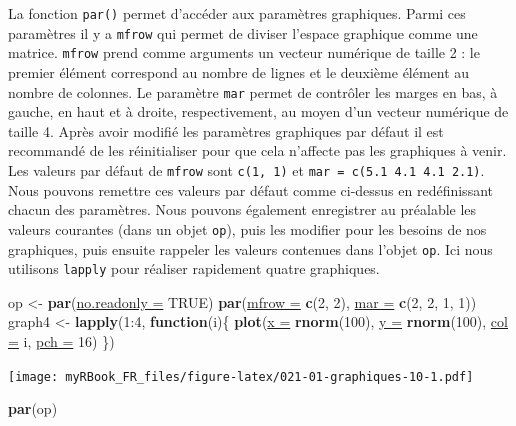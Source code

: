 \documentclass[twoside,symmetric]{book}
\newenvironment{Shaded}{}{}
\newcommand{\ControlFlowTok}[1]{\textbf{#1}}
\newcommand{\DataTypeTok}[1]{\underline{#1}}
\newcommand{\DecValTok}[1]{#1}
\newcommand{\KeywordTok}[1]{\textbf{#1}}
\newcommand{\NormalTok}[1]{#1}
\newcommand{\OperatorTok}[1]{#1}
\newcommand{\OtherTok}[1]{#1}
\newcommand{\StringTok}[1]{#1}
\begin{document}
La fonction \texttt{par()} permet d'accéder aux paramètres graphiques. Parmi ces paramètres il y a \texttt{mfrow} qui permet de diviser l'espace graphique comme une matrice. \texttt{mfrow} prend comme arguments un vecteur numérique de taille 2 : le premier élément correspond au nombre de lignes et le deuxième élément au nombre de colonnes. Le paramètre \texttt{mar} permet de contrôler les marges en bas, à gauche, en haut et à droite, respectivement, au moyen d'un vecteur numérique de taille 4. Après avoir modifié les paramètres graphiques par défaut il est recommandé de les réinitialiser pour que cela n'affecte pas les graphiques à venir. Les valeurs par défaut de \texttt{mfrow} sont \texttt{c(1,\ 1)} et \texttt{mar\ =\ c(5.1\ 4.1\ 4.1\ 2.1)}. Nous pouvons remettre ces valeurs par défaut comme ci-dessus en redéfinissant chacun des paramètres. Nous pouvons également enregistrer au préalable les valeurs courantes (dans un objet \texttt{op}), puis les modifier pour les besoins de nos graphiques, puis ensuite rappeler les valeurs contenues dans l'objet \texttt{op}. Ici nous utilisons \texttt{lapply} pour réaliser rapidement quatre graphiques.

\begin{Shaded}
\begin{Highlighting}[]
\NormalTok{op <-}\StringTok{ }\KeywordTok{par}\NormalTok{(}\DataTypeTok{no.readonly =} \OtherTok{TRUE}\NormalTok{)}
\KeywordTok{par}\NormalTok{(}\DataTypeTok{mfrow =} \KeywordTok{c}\NormalTok{(}\DecValTok{2}\NormalTok{, }\DecValTok{2}\NormalTok{), }\DataTypeTok{mar =} \KeywordTok{c}\NormalTok{(}\DecValTok{2}\NormalTok{, }\DecValTok{2}\NormalTok{, }\DecValTok{1}\NormalTok{, }\DecValTok{1}\NormalTok{))}
\NormalTok{graph4 <-}\StringTok{ }\KeywordTok{lapply}\NormalTok{(}\DecValTok{1}\OperatorTok{:}\DecValTok{4}\NormalTok{, }\ControlFlowTok{function}\NormalTok{(i)\{}
  \KeywordTok{plot}\NormalTok{(}\DataTypeTok{x =} \KeywordTok{rnorm}\NormalTok{(}\DecValTok{100}\NormalTok{), }
    \DataTypeTok{y =} \KeywordTok{rnorm}\NormalTok{(}\DecValTok{100}\NormalTok{), }
    \DataTypeTok{col =}\NormalTok{ i, }\DataTypeTok{pch =} \DecValTok{16}\NormalTok{)}
\NormalTok{\})}
\end{Highlighting}
\end{Shaded}

\texttt{[image: myRBook\_FR\_files/figure-latex/021-01-graphiques-10-1.pdf]}

\begin{Shaded}
\begin{Highlighting}[]
\KeywordTok{par}\NormalTok{(op)}
\end{Highlighting}
\end{Shaded}
\end{document}
